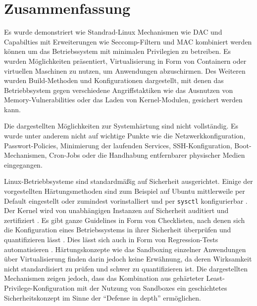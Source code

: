 
\chapter{Zusammenfassung}

Es wurde demonstriert wie Standrad-Linux Mechanismen wie DAC und Capabilties mit Erweiterungen wie Seccomp-Filtern und MAC kombiniert werden können um das Betriebssystem mit minimalen Privilegien zu betreiben. Es wurden Möglichkeiten präsentiert, Virtualisierung in Form von Containern oder virtuellen Maschinen zu nutzen, um Anwendungen abzuschirmen. Des Weiteren wurden Build-Methoden und Konfigurationen dargestellt, mit denen das Betriebbsystem gegen verschiedene Angriffstaktiken
wie das Ausnutzen von Memory-Vulnerabilities oder das Laden von Kernel-Modulen, gesichert werden kann.

Die dargestellten Möglichkeiten zur Systemhärtung sind nicht vollständig. Es wurde unter anderem nicht auf wichtige Punkte wie die Netzwerkkonfiguration, Passwort-Policies, Minimierung der laufenden Services, SSH-Konfiguration, Boot-Mechanismen, Cron-Jobs oder die Handhabung entfernbarer physischer Medien eingegangen.

Linux-Betriebbsysteme sind standardmäßig auf Sicherheit ausgerichtet. Einige der vorgestellten Härtungsmethoden sind zum Beispiel auf Ubuntu mittlerweile per Default eingestellt oder zumindest vorinstalliert und per \texttt{sysctl} konfigurierbar \cite{ubuntu-security-features}. Der Kernel wird von unabhängigen Instanzen auf Sicherheit auditiert und zertifiziert \cite{ubuntu-certifications}. Es gibt ganze Guidelines in Form von Checklisten, nach denen sich die Konfiguration eines Betriebssystems in
ihrer Sicherheit überprüfen und quantifizieren lässt \cite{cis}. Dies lässt sich auch in Form von Regression-Tests automatisieren \cite{qa-regression}. Härtungskonzepte wie das Sandboxing einzelner Anwendungen über Virtualisierung finden darin jedoch keine Erwähnung, da deren Wirksamkeit nicht standardisiert zu prüfen und schwer zu quantifizieren ist. Die dargestellten Mechanismen zeigen jedoch, dass das Kombination aus gehärteter Least-Privilege-Konfiguration mit der Nutzung von
Sandboxes ein geschichtetes Sicherheitskonzept im Sinne der ``Defense in depth'' ermöglichen.
